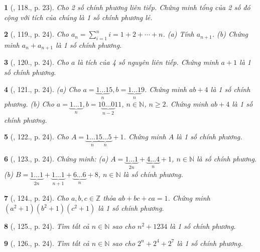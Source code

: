 \documentclass{article}
\newtheorem{baitoan}{}
\begin{document}
\begin{baitoan}[\cite{Tuyen_Toan_8}, 118., p. 23]
	Cho 2 số chính phương liên tiếp. Chứng minh tổng của 2 số đó cộng với tích của chúng là 1 số chính phương lẻ.
\end{baitoan}

\begin{baitoan}[\cite{Tuyen_Toan_8}, 119., p. 24]
	Cho $a_n = \sum_{i=1}^n i  = 1 + 2 + \cdots + n$. (a) Tính $a_{n+1}$. (b) Chứng minh $a_n + a_{n+1}$ là 1 số chính phương.
\end{baitoan}

\begin{baitoan}[\cite{Tuyen_Toan_8}, 120., p. 24]
	Cho $a$ là tích của 4 số nguyên liên tiếp. Chứng minh $a + 1$ là 1 số chính phương.
\end{baitoan}

\begin{baitoan}[\cite{Tuyen_Toan_8}, 121., p. 24]
	(a) Cho $a = \underbrace{1\ldots1}_n5,b = \underbrace{1\ldots1}_n9$. Chứng minh $ab + 4$ là 1 số chính phương. (b) Cho $a = \underbrace{1\ldots1}_n,b = 1\underbrace{0\ldots0}_{n-2}11$, $n\in\mathbb{N}$, $n\ge2$. Chứng minh $ab + 4$ là 1 số chính phương.
\end{baitoan}

\begin{baitoan}[\cite{Tuyen_Toan_8}, 122., p. 24]
	Cho $A = \underbrace{1\ldots1}_n\underbrace{5\ldots5}_n + 1$. Chứng minh $A$ là 1 số chính phương.
\end{baitoan}

\begin{baitoan}[\cite{Tuyen_Toan_8}, 123., p. 24]
	Chứng minh: (a) $A = \underbrace{1\ldots1}_{2n} + \underbrace{4\ldots4}_n + 1$, $n\in\mathbb{N}$ là số chính phương. (b) $B = \underbrace{1\ldots1}_{2n} + \underbrace{1\ldots1}_{n + 1} + \underbrace{6\ldots6}_n + 8$, $n\in\mathbb{N}$ là số chính phương.
\end{baitoan}

\begin{baitoan}[\cite{Tuyen_Toan_8}, 124., p. 24]
	Cho $a,b,c\in\mathbb{Z}$ thỏa $ab + bc + ca = 1$. Chứng minh $(a^2 + 1)(b^2 + 1)(c^2 + 1)$ là 1 số chính phương.
\end{baitoan}

\begin{baitoan}[\cite{Tuyen_Toan_8}, 125., p. 24]
	Tìm tất cả $n\in\mathbb{N}$ sao cho $n^2 + 1234$ là 1 số chính phương.
\end{baitoan}

\begin{baitoan}[\cite{Tuyen_Toan_8}, 126., p. 24]
	Tìm tất cả $n\in\mathbb{N}$ sao cho $2^n + 2^4 + 2^7$ là 1 số chính phương.
\end{baitoan}
\end{document}
